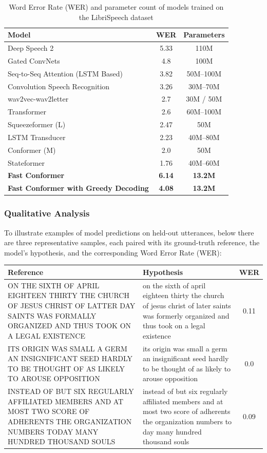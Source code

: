 \begin{table}[H]
	\centering
	\begin{tabular}{|l|c|c|}
		\hline
		\textbf{Model} & \textbf{WER} & \textbf{Parameters} \\
		\hline
		Deep Speech 2 & 5.33 & 110M \\
		Gated ConvNets & 4.8 & 100M \\
		Seq-to-Seq Attention (LSTM Based) & 3.82 & 50M--100M \\
		Convolution Speech Recognition & 3.26 & 30M--70M \\
		wav2vec-wav2letter & 2.7 & 30M / 50M \\
		Transformer & 2.6 & 60M--100M \\
		Squeezeformer (L) & 2.47 & 50M \\
		LSTM Transducer & 2.23 & 40M--80M \\
		Conformer (M) & 2.0 & 50M \\
		Stateformer & 1.76 & 40M--60M \\
		\textbf{Fast Conformer} & \textbf{6.14} & \textbf{13.2M} \\
		\textbf{Fast Conformer with Greedy Decoding} & \textbf{4.08} & \textbf{13.2M} \\
		\hline
	\end{tabular}
	\caption{Word Error Rate (WER) and parameter count of models trained on the LibriSpeech dataset}
	\label{tab:wer_librispeech_models}
\end{table}

\subsubsection{Qualitative Analysis}
To illustrate examples of model predictions on held-out utterances, below there are three representative samples, each paired with its ground-truth reference, the model’s hypothesis, and the corresponding Word Error Rate (WER):


\begin{tabularx}{\linewidth}{X X c}
	\hline
	\textbf{Reference} & \textbf{Hypothesis} & \textbf{WER} \\
	\hline
	ON THE SIXTH OF APRIL EIGHTEEN THIRTY THE CHURCH OF JESUS CHRIST OF LATTER DAY SAINTS WAS FORMALLY ORGANIZED AND THUS TOOK ON A LEGAL EXISTENCE &
	on the sixth of april eighteen thirty the church of jesus christ of later saints was formerly organized and thus took on a legal existence &
	0.11 \\
	\hline
	ITS ORIGIN WAS SMALL A GERM AN INSIGNIFICANT SEED HARDLY TO BE THOUGHT OF AS LIKELY TO AROUSE OPPOSITION &
	its origin was small a germ an insignificant seed hardly to be thought of as likely to arouse opposition &
	0.0 \\
	\hline
	INSTEAD OF BUT SIX REGULARLY AFFILIATED MEMBERS AND AT MOST TWO SCORE OF ADHERENTS THE ORGANIZATION NUMBERS TODAY MANY HUNDRED THOUSAND SOULS &
	instead of but six regularly affiliated members and at most two score of adherents the organization numbers to day many hundred thousand souls &
	0.09 \\
	\hline
\end{tabularx}

